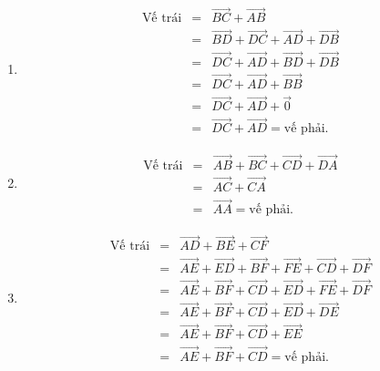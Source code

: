 \begin{bt}
{\begin{enumerate}
\begin{eqnarray*}
				& &\overrightarrow{AB}-\overrightarrow{AD}=\overrightarrow{CB}-\overrightarrow{CD}\\
				&\Leftrightarrow& \overrightarrow{DB}=\overrightarrow{DB} (\text{đúng}).\\
				&\text{Vậy}& \overrightarrow{AB}-\overrightarrow{AD}=\overrightarrow{CB}-\overrightarrow{CD}.
			\end{eqnarray*}
			\item \begin{eqnarray*}
				\text{Vế trái}
				&=&\overrightarrow{BC}+\overrightarrow{AB}\\
				&=&\overrightarrow{BD}+\overrightarrow{DC}+\overrightarrow{AD}+\overrightarrow{DB}\\
				&=&\overrightarrow{DC}+\overrightarrow{AD}+\overrightarrow{BD}+\overrightarrow{DB}\\
				&=&\overrightarrow{DC}+\overrightarrow{AD}+\overrightarrow{BB}\\
				&=&\overrightarrow{DC}+\overrightarrow{AD}+\overrightarrow{0}\\
				&=&\overrightarrow{DC}+\overrightarrow{AD}=\text{vế phải}.
			\end{eqnarray*}
			\item \begin{eqnarray*}
				\text{Vế trái}
				&=&\overrightarrow{AB}+\overrightarrow{BC}+\overrightarrow{CD}+\overrightarrow{DA}\\
				&=&\overrightarrow{AC}+\overrightarrow{CA}\\
				&=&\overrightarrow{AA}=\text{vế phải}.
			\end{eqnarray*}
			\item \begin{eqnarray*}
				\text{Vế trái}
				&=&\overrightarrow{AD}+\overrightarrow{BE}+\overrightarrow{CF}\\
				&=&\overrightarrow{AE}+\overrightarrow{ED}+\overrightarrow{BF}+\overrightarrow{FE}+\overrightarrow{CD}+\overrightarrow{DF}\\
				&=&\overrightarrow{AE}+\overrightarrow{BF}+\overrightarrow{CD}+\overrightarrow{ED}+\overrightarrow{FE}+\overrightarrow{DF}\\
				&=&\overrightarrow{AE}+\overrightarrow{BF}+\overrightarrow{CD}+\overrightarrow{ED}+\overrightarrow{DE}\\
				&=&\overrightarrow{AE}+\overrightarrow{BF}+\overrightarrow{CD}+\overrightarrow{EE}\\
				&=&\overrightarrow{AE}+\overrightarrow{BF}+\overrightarrow{CD}=\text{vế phải}.
			\end{eqnarray*}

\end{enumerate}}
\end{bt}
